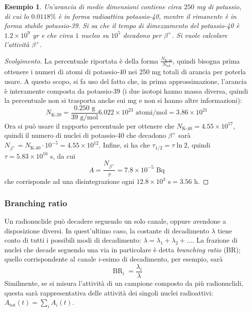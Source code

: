 \documentclass[11pt, a4paper]{scrartcl}
\newenvironment{svolgimento}{\renewcommand\qedsymbol{$\blacksquare$}\begin{proof}[Svolgimento]}{\end{proof}}
\theoremstyle{style}
\newtheorem{esempio}{Esempio}[section]
\theoremstyle{style1}
\numberwithin{equation}{subsection}
\begin{document}
\begin{esempio}
Un'arancia di medie dimensioni contiene circa $250$ mg di potassio, di cui lo $0.0118\%$ \`e in forma radioattiva potassio-40, mentre il rimanente \`e in forma stabile potassio-39.
Si sa che il tempo di dimezzamento del potassio-40 \`e $1.2 \times 10^{9}$ yr e che circa $1$ nucleo su $10^5$ decadono per $\beta ^+$.
Si vuole calcolare l'attivit\`a $\beta ^+$.
\end{esempio}
\begin{svolgimento}
	La percentuale riportata \`e della forma $\frac{N_{\text{K-40}}}{N_\text{tot}}$, quindi bisogna prima ottenere i numeri di atomi di potassio-40 nei 250 mg totali di arancia per poterla usare.
	A questo scopo, si fa uso del fatto che, in prima approssimazione, l'arancia \`e interamente composta da potassio-39 (i due isotopi hanno massa diversa, quindi la percentuale non si trasporta anche sui mg e non si hanno altre informazioni):
	\[
		N_\text{K-39} =  \frac{0.250 \text{ g}}{39 \text{ g}/\text{mol}} 6.022 \times 10^{23}\text{ atomi}/\text{mol} = 3.86\times 10^{21}
	\] 
Ora si pu\`o usare il rapporto percentuale per ottenere che $N_{\text{K-40}} = 4.55 \times 10^{17}$, quindi il numero di nuclei di potassio-40 che decadono $\beta ^+$ sar\`a $N_{\beta ^+} = N_\text{K-40} \cdot 10^{-5} = 4.55 \times 10^{12}$.
Infine, si ha che $\tau _{1 / 2} = \tau  \ln 2$, quindi $\tau = 5.83 \times 10^{16}$ s, da cui 
\[
A = \frac{N_{\beta ^+}}{\tau } = 7.8 \times  10^{-5} \text{ Bq}
\] 
che corrisponde ad una disintegrazione ogni $12.8 \times 10^{3} \text{ s} = 3.56$ h.
\end{svolgimento}
\subsubsection{Branching ratio}

Un radionuclide pu\`o decadere seguendo un solo canale, oppure avendone a disposizione diversi.
In quest'ultimo caso, la costante di decadimento $\lambda $ tiene conto di tutti i possibili modi di decadimento: $\lambda  = \lambda _1 + \lambda _2 + \ldots$.
La frazione di nuclei che decade seguendo una via in particolare \`e detta \textit{branching ratio} (BR); quello corrispondente al canale $i$-esimo di decadimento, per esempio, sar\`a
\begin{equation}
	\operatorname{BR} _i = \frac{\lambda _i}{ \lambda }
\end{equation}
Similmente, se si misura l'attivit\`a di un campione composto da pi\`u radionuclidi, questa sar\`a rappresentativa delle attivit\`a dei singoli nuclei radioattivi: $A_\text{tot}(t) = \sum_{i}^{} A_i(t)$.
\end{document}
